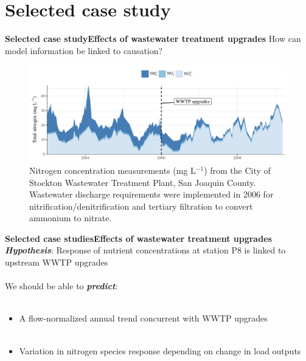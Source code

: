 \documentclass[serif]{beamer}\usepackage[]{graphicx}\usepackage[]{color}
\newcommand{\emtxt}[1]{\textbf{\textit{#1}}}
\begin{document}
\section{Selected case study}



\begin{frame}{\textbf{Selected case study}}{\textbf{Effects of wastewater treatment upgrades}}
How can model information be linked to causation?
\vspace{0.1in}
\begin{figure}
\centerline{\includegraphics[width = \textwidth]{fig/stock.pdf}}
\caption{Nitrogen concentration measurements (mg L$^{-1}$) from the City of Stockton Wastewater Treatment Plant, San Joaquin County.  Wastewater discharge requirements were implemented in 2006 for nitrification/denitrification and tertiary filtration to convert ammonium to nitrate.}
\end{figure}
\end{frame}

\begin{frame}{\textbf{Selected case studies}}{\textbf{Effects of wastewater treatment upgrades}}
\emtxt{Hypothesis}: Response of nutrient concentrations at station P8 is linked to upstream WWTP upgrades \\~\\
We should be able to \emtxt{predict}: \\~\\
\begin{itemize}
\item A flow-normalized annual trend concurrent with WWTP upgrades \\~\\
\item Variation in nitrogen species response depending on change in load outputs
\end{itemize}
\end{frame}
\end{document}

